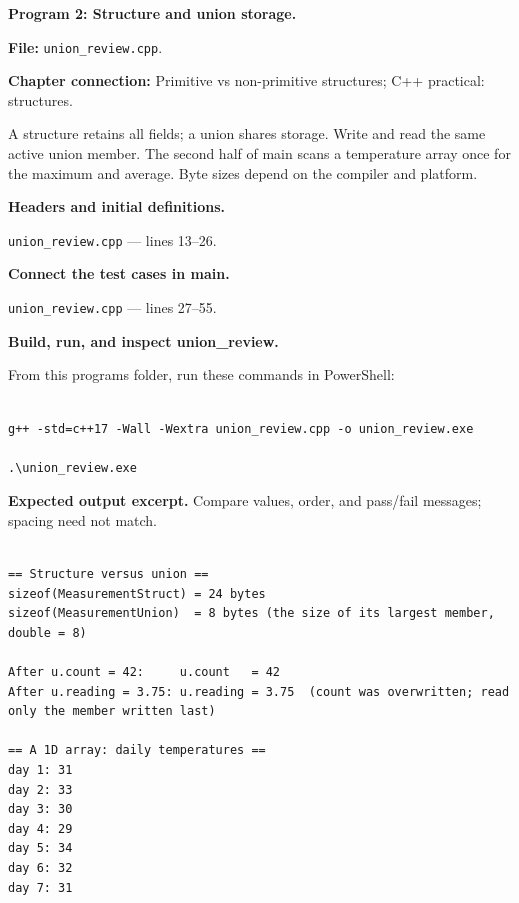 \textbf{Program 2: Structure and union storage.}

\textbf{File:} \texttt{union\_review.cpp}.

\textbf{Chapter connection:} Primitive vs non-primitive structures; C++ practical: structures.

A structure retains all fields; a union shares storage. Write and read the same active union member. The second half of main scans a temperature array once for the maximum and average. Byte sizes depend on the compiler and platform.



\begin{utpsteps}\setcounter{enumi}{0}\item \textbf{Headers and initial definitions.}\end{utpsteps}

\texttt{union\_review.cpp} --- lines 13--26.




\tcbbreak

\begin{utpsteps}\setcounter{enumi}{1}\item \textbf{Connect the test cases in main.}\end{utpsteps}

\texttt{union\_review.cpp} --- lines 27--55.






\tcbbreak

\textbf{Build, run, and inspect union\_review.}

From this program\textquotesingle s folder, run these commands in PowerShell:

\begin{lstlisting}[style=utpterminal,language={}]

g++ -std=c++17 -Wall -Wextra union_review.cpp -o union_review.exe

.\union_review.exe

\end{lstlisting}

\textbf{Expected output excerpt.} Compare values, order, and pass/fail messages; spacing need not match.

\begin{lstlisting}[style=utpterminal,language={}]

== Structure versus union ==
sizeof(MeasurementStruct) = 24 bytes
sizeof(MeasurementUnion)  = 8 bytes (the size of its largest member, double = 8)

After u.count = 42:     u.count   = 42
After u.reading = 3.75: u.reading = 3.75  (count was overwritten; read only the member written last)

== A 1D array: daily temperatures ==
day 1: 31
day 2: 33
day 3: 30
day 4: 29
day 5: 34
day 6: 32
day 7: 31

\end{lstlisting}

